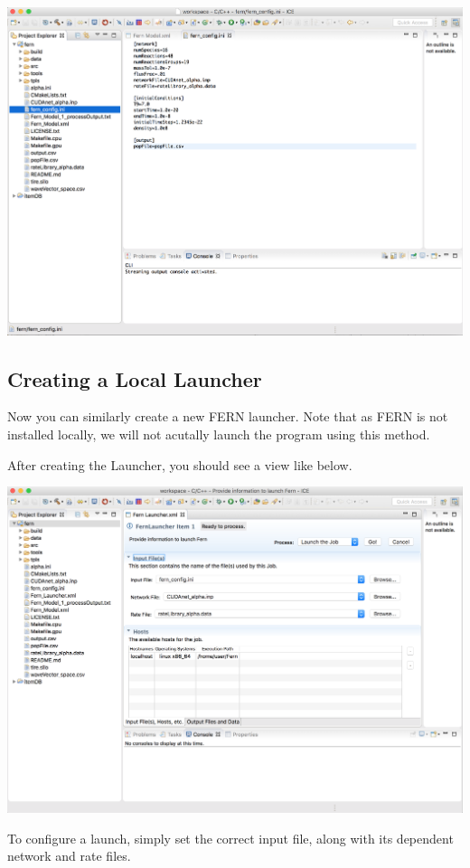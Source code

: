 \begin{center} \includegraphics[width=\textwidth]{figures/result}
\end{center}

\subsection{Creating a Local Launcher}

Now you can similarly create a new FERN launcher. Note that as FERN is not
installed locally, we will not acutally launch the program using this method.

After creating the Launcher,
you should see a view like below. 
\begin{center} \includegraphics[width=\textwidth]{figures/launcher}
\end{center}
To configure a launch, simply set the correct
input file, along with its dependent network and rate files. 


